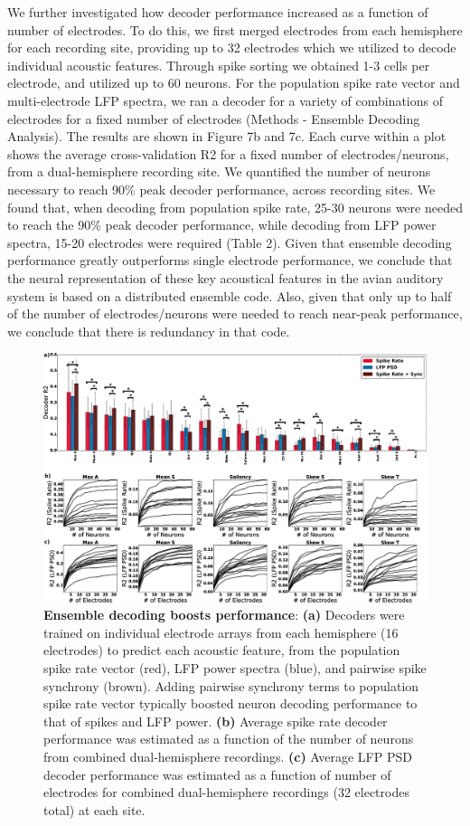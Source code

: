 We further investigated how decoder performance increased as a function of number of electrodes. To do this, we first merged electrodes from each hemisphere for each recording site, providing up to 32 electrodes which we utilized to decode individual acoustic features. Through spike sorting we obtained 1-3 cells per electrode, and utilized up to 60 neurons. For the population spike rate vector and multi-electrode LFP spectra, we ran a decoder for a variety of combinations of electrodes for a fixed number of electrodes (Methods - Ensemble Decoding Analysis). The results are shown in Figure 7b and 7c. Each curve within a plot shows the average cross-validation R2 for a fixed number of electrodes/neurons, from a dual-hemisphere recording site. We quantified the number of neurons necessary to reach 90\% peak decoder performance, across recording sites. We found that, when decoding from population spike rate, 25-30 neurons were needed to reach the 90\% peak decoder performance, while decoding from LFP power spectra, 15-20 electrodes were required (Table 2). Given that ensemble decoding performance greatly outperforms single electrode performance, we conclude that the neural representation of these key acoustical features in the avian auditory system is based on a distributed ensemble code. Also, given that only up to half of the number of electrodes/neurons were needed to reach near-peak performance, we conclude that there is redundancy in that code.

\begin{figure}
    \caption{\textbf{Ensemble decoding boosts performance}: \textbf{(a)} Decoders were trained on individual electrode arrays from each hemisphere (16 electrodes) to predict each acoustic feature, from the population spike rate vector (red), LFP power spectra (blue), and pairwise spike synchrony (brown). Adding pairwise synchrony terms to population spike rate vector typically boosted neuron decoding performance to that of spikes and LFP power. \textbf{(b)} Average spike rate decoder performance was estimated as a function of the number of neurons from combined dual-hemisphere recordings. \textbf{(c)} Average LFP PSD decoder performance was estimated as a function of number of electrodes for combined dual-hemisphere recordings (32 electrodes total) at each site.
}
    \centering
    \includegraphics[scale=0.25]{figure7.eps}
\end{figure}

